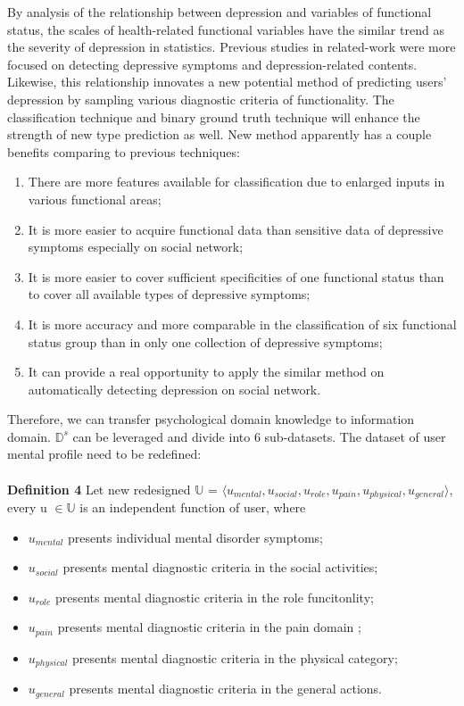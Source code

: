 \documentclass[runningheads]{llncs}
\begin{document}
By analysis of the relationship between depression and variables of functional status, the scales of health-related functional variables have the similar trend as the severity of depression in statistics. Previous studies in related-work were more focused on detecting depressive symptoms and depression-related contents. Likewise, this relationship innovates a new potential method of predicting users' depression by sampling various diagnostic criteria of functionality. The classification technique and binary ground truth technique will enhance the strength of new type prediction as well. New method apparently has a couple benefits comparing to previous techniques:
\begin{enumerate}[label=\alph*)]
  \item There are more features available for classification due to enlarged inputs in various functional areas;
  \item It is more easier to acquire functional data than sensitive data of depressive symptoms especially on social network; 
  \item It is more easier to cover sufficient specificities of one functional status than to cover all available types of depressive symptoms;
  \item It is more accuracy and more comparable in the classification of six functional status group than in only one collection of depressive symptoms;
  \item It can provide a real opportunity to apply the similar method on automatically detecting depression on social network.
\end{enumerate}

Therefore, we can transfer psychological domain knowledge to information domain. \textit{$\mathbb{D}^s$} can be leveraged and divide into 6 sub-datasets. The dataset of user mental profile need to be redefined:\\
\\
\textbf{Definition 4} Let new redesigned $\mathbb{U}$ = $\langle u_{mental}, u_{social}, u_{role}, u_{pain}, u_{physical}, u_{general} \rangle$, every u  $\in \mathbb{U}$ is an independent function of user, where
\begin{itemize}
  \item $u_{mental}$ presents individual mental disorder symptoms;
  \item $u_{social}$ presents mental diagnostic criteria in the social activities;
  \item $u_{role}$ presents mental diagnostic criteria in the role funcitonlity;
  \item $u_{pain}$ presents mental diagnostic criteria in the pain domain ;
  \item $u_{physical}$ presents mental diagnostic criteria in the physical category;
  \item $u_{general}$ presents mental diagnostic criteria in the general actions.
\end{itemize}
%
%
\end{document}
